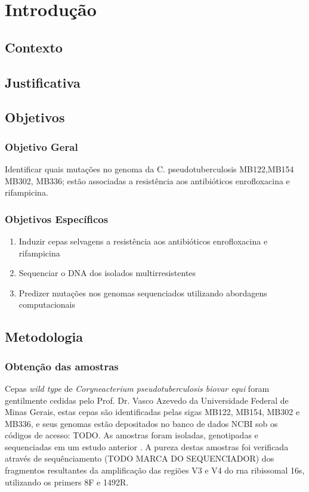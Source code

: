 \chapter{Introdução}
\label{cap:introducao}

\section{Contexto}

\section{Justificativa}

\section{Objetivos}

\subsection{Objetivo Geral}

Identificar quais mutações no genoma da C. pseudotuberculosis MB122,MB154 MB302, MB336; estão associadas a resistência aos antibióticos enrofloxacina e rifampicina.

\subsection{Objetivos Específicos}
\begin{enumerate}
    \item Induzir cepas selvagens a resistência aos antibióticos enrofloxacina e rifampicina
    \item Sequenciar o DNA dos isolados multirresistentes
    \item Predizer mutações nos genomas sequenciados utilizando abordagens computacionais
\end{enumerate}

\section{Metodologia}

\subsection{Obtenção das amostras}

Cepas \textit{wild type} de \textit{Coryneacterium pseudotuberculosis biovar equi} foram gentilmente cedidas pelo Prof. Dr. Vasco Azevedo 
da Universidade Federal de Minas Gerais, estas cepas são identificadas pelas sigas MB122, MB154, MB302 e MB336, e seus genomas estão
depositados no banco de dados NCBI sob os códigos de acesso: TODO. As amostras foram isoladas, genotipadas e sequenciadas em um estudo anterior \cite{barauna2017}.
A pureza destas amostras foi verificada através de sequênciamento (TODO MARCA DO SEQUENCIADOR) dos fragmentos resultantes da 
amplificação das regiões V3 e V4 do rna ribissomal 16s, utilizando os primers 8F e 1492R.



